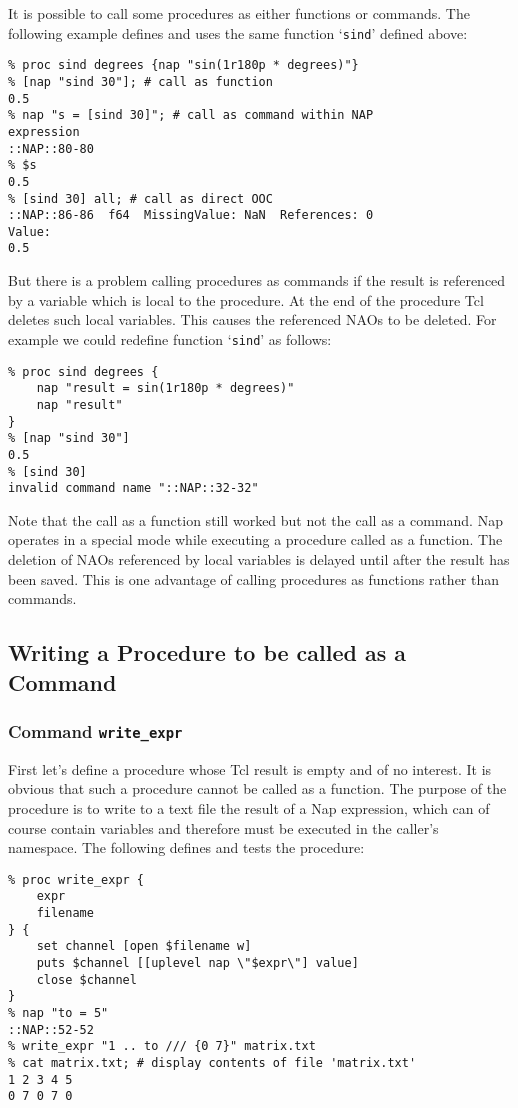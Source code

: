   

It is possible to call some procedures as either functions or
  commands. The following example defines and uses the same function
  `\texttt{sind}' defined above:
  \begin{verbatim}
% proc sind degrees {nap "sin(1r180p * degrees)"}
% [nap "sind 30"]; # call as function
0.5
% nap "s = [sind 30]"; # call as command within NAP
expression
::NAP::80-80
% $s
0.5
% [sind 30] all; # call as direct OOC
::NAP::86-86  f64  MissingValue: NaN  References: 0
Value:
0.5
\end{verbatim}

  

But there is a problem calling procedures as commands if the
  result is referenced by a variable which is local to the procedure.
  At the end of the procedure Tcl deletes such local variables. This
  causes the referenced NAOs to be deleted. For example we could
  redefine function `\texttt{sind}' as follows:
  \begin{verbatim}
% proc sind degrees {
    nap "result = sin(1r180p * degrees)"
    nap "result"
}
% [nap "sind 30"]
0.5
% [sind 30]
invalid command name "::NAP::32-32"
\end{verbatim}

  

Note that the call as a function still worked but not the call as
  a command. Nap operates in a special mode while executing a procedure
  called as a function. The deletion of NAOs referenced by local
  variables is delayed until after the result has been saved. This is
  one advantage of calling procedures as functions rather than
  commands.

\subsection{Writing a Procedure to be called as a Command}
    \label{writing-procs-Command}

\subsubsection{Command \texttt{write\_expr}}
    \label{writing-procs-write-expr}

First let's define a procedure whose Tcl result is empty and
  of no interest. It is obvious that such a procedure cannot be called
  as a function. The purpose of the procedure is to write to a text
  file the result of a Nap expression, which can of course contain
  variables and therefore must be executed in the caller's
  namespace. The following defines and tests the procedure:
  \begin{verbatim}
% proc write_expr {
    expr
    filename
} {
    set channel [open $filename w]
    puts $channel [[uplevel nap \"$expr\"] value]
    close $channel
}
% nap "to = 5"
::NAP::52-52
% write_expr "1 .. to /// {0 7}" matrix.txt
% cat matrix.txt; # display contents of file 'matrix.txt'
1 2 3 4 5
0 7 0 7 0
\end{verbatim}

